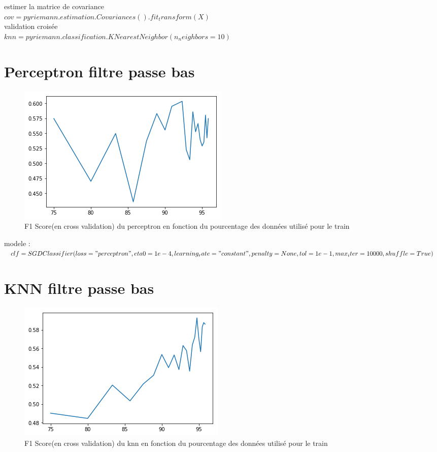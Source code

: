 \documentclass{article}
\begin{document}
estimer la matrice de covariance\\
$
cov = pyriemann.estimation.Covariances().fit_transform(X)
$
\\
validation croisée\\
$
knn = pyriemann.classification.KNearestNeighbor(n_neighbors=10)
$
\section{Perceptron filtre passe bas }
\begin{figure}[H]
\begin{center}
\includegraphics[scale=1]{images/perceptron_passe_bas_f1Score.png}
\end{center}
\caption{F1 Score(en cross validation) du perceptron en fonction du pourcentage des données utilisé pour le train}
\end{figure}
modele :\\
$
 clf = SGDClassifier(loss="perceptron", eta0=1e-4, learning_rate="constant", penalty=None,tol=1e-1,max_iter=10000,shuffle=True)    
$

\section{KNN filtre passe bas }
\begin{figure}[H]
\begin{center}
\includegraphics[scale=1]{images/knn_passe_bas_f1Score.png}
\end{center}
\caption{F1 Score(en cross validation) du knn en fonction du pourcentage des données utilisé pour le train}
\end{figure}
\end{document}
